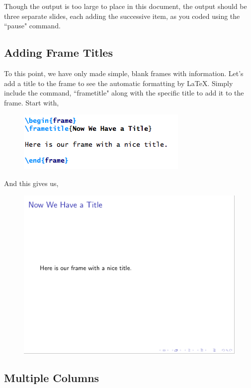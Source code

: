 \documentclass[11pt]{article}
\newcommand{\forceindent}{\leavevmode{\parindent=1.5em\indent}} %
\begin{document}
Though the output is too large to place in this document, the output should be three separate slides, each adding the successive item, as you coded using the ``pause" command. 

\subsection{Adding Frame Titles}

\forceindent To this point, we have only made simple, blank frames with information. Let's add a title to the frame to see the automatic formatting by \LaTeX. Simply include the command, ``frametitle" along with the specific title to add it to the frame. Start with,

\begin{figure}[!h]
	\includegraphics[scale=.6]{CODE5}
	\centering
\end{figure}

And this gives us, 

\begin{figure}[!h]
	\includegraphics[scale=.5]{OUT5}
	\centering
\end{figure}

\subsection{Multiple Columns}
\end{document}
